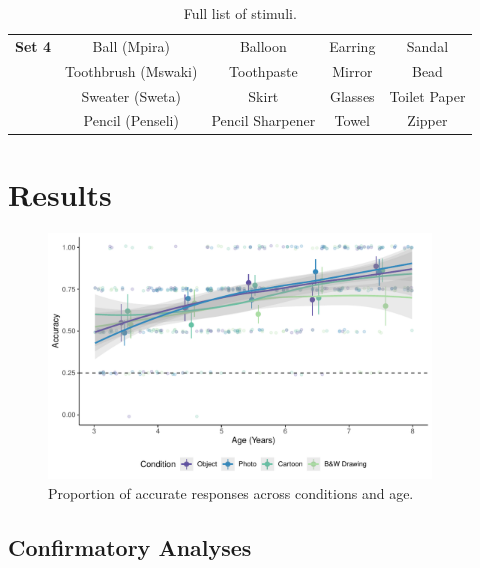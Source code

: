 \documentclass[10pt, letterpaper]{article}
\begin{document}
\begin{table}[]
\begin{tabular}{@{}ccccc@{}}
\textbf{Set 4}       & Ball (Mpira)                   & Balloon                  & Earring                    & Sandal                     \\
                     & Toothbrush (Mswaki)            & Toothpaste               & Mirror                     & Bead                       \\
                     & Sweater (Sweta)                & Skirt                    & Glasses                    & Toilet Paper               \\
                     & Pencil (Penseli)               & Pencil Sharpener         & Towel                      & Zipper
\end{tabular}
\caption{Full list of stimuli.}
\end{table}

\section{Results}\label{results}

\begin{CodeChunk}
\begin{figure}[tb]

{\centering \includegraphics[width=4in]{figs/fig2-1} 

}

\caption[Proportion of accurate responses across conditions and age]{Proportion of accurate responses across conditions and age.}\label{fig:fig2}
\end{figure}
\end{CodeChunk}

\subsection{Confirmatory Analyses}\label{confirmatory-analyses}
\end{document}
